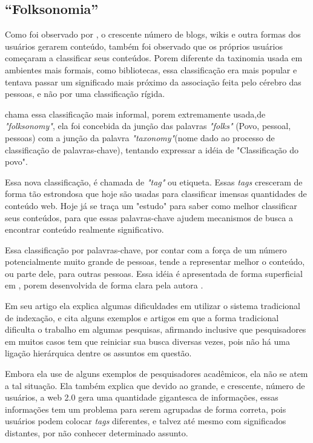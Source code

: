 \documentclass[
	12pt,				%
	openright,			%
	twoside,			%
	a4paper,			%
	Times,
	brazil,				%
	]{abntex2}
\begin{document}
\subsection{“Folksonomia”}


Como foi observado por , o crescente número de blogs, wikis e outra formas dos usuários gerarem conteúdo, também foi observado que os próprios usuários começaram a classificar seus conteúdos. Porem diferente da taxinomia usada em ambientes mais formais, como bibliotecas, essa classificação era mais popular e tentava passar um significado mais próximo da associação feita pelo cérebro das pessoas, e não por uma classificação rígida.
\par

 chama essa classificação mais informal, porem extremamente usada,de \textit{"folksonomy"}, ela foi concebida da junção das palavras \textit{"folks"} (Povo, pessoal, pessoas) com a junção da palavra \textit{"taxonomy"}(nome dado ao processo de classificação de palavras-chave), tentando expressar a idéia de "Classificação do povo".\cite{tag-2}
\par 

Essa nova classificação, é chamada de \textit{"tag"} ou etiqueta. Essas \textit{tags} cresceram de forma tão estrondosa que hoje são usadas para classificar imensas quantidades de conteúdo web. Hoje já se traça um "estudo" para saber como melhor classificar seus conteúdos, para que essas palavras-chave ajudem mecanismos de busca a encontrar conteúdo realmente significativo.\cite{web2.0, tag, tag-2}
\par

Essa classificação por palavras-chave, por contar com a força de um número potencialmente muito grande de pessoas, tende a representar melhor o conteúdo, ou parte dele, para outras pessoas. Essa idéia é apresentada de forma superficial em , porem desenvolvida de forma clara pela autora .
\par
Em seu artigo ela explica algumas dificuldades em utilizar o sistema tradicional de indexação, e cita alguns exemplos e artigos em que a forma tradicional dificulta o trabalho em algumas pesquisas, afirmando inclusive que pesquisadores em muitos casos tem que reiniciar sua busca diversas vezes, pois não há uma ligação hierárquica dentre os assuntos em questão.\cite{tag-2}
\par

Embora ela use de alguns exemplos de pesquisadores acadêmicos, ela não se atem a tal situação. Ela também explica que devido ao grande, e crescente, número de usuários, a web 2.0 gera uma quantidade gigantesca de informações, essas informações tem um problema para serem agrupadas de forma correta, pois usuários podem colocar \textit{tags} diferentes, e talvez até mesmo com significados distantes, por não conhecer determinado assunto.\cite{tag-2}
\par
\end{document}
